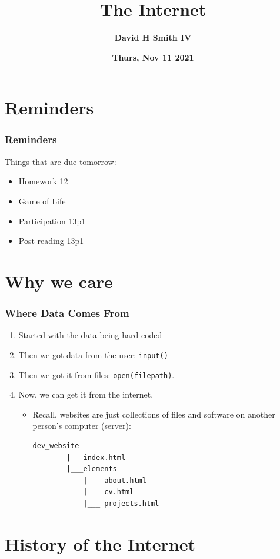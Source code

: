 \documentclass{beamer}
\title{\textbf{The Internet}}
\author{\textbf{David H Smith IV}}
\institute[\textbf{UIUC}]{\textbf{University of Illinois Urbana-Champaign}}
\date{\textbf{Thurs, Nov 11 2021}}
\begin{document}
\frame{\titlepage}

\section{Reminders}

%
%
\begin{frame}
    \frametitle{Reminders}
    Things that are due tomorrow:
    \begin{itemize}
        \item Homework 12 
        \item Game of Life 
        \item Participation 13p1
        \item Post-reading 13p1
    \end{itemize}
\end{frame}

\section{Why we care}
%
%
\begin{frame}[fragile]
    \frametitle{Where Data Comes From}
    \begin{enumerate}
        \item Started with the data being hard-coded
            \pause
        \item Then we got data from the user: \lstinline|input()|
            \pause
        \item Then we got it from files: \lstinline|open(filepath)|.
            \pause
        \item Now, we can get it from the internet. 
            \begin{itemize}
                \item Recall, websites are just collections of files and software on another person's computer (server):
                    \begin{lstlisting}[autogobble]
        dev_website
        |---index.html
        |___elements
            |--- about.html
            |--- cv.html
            |___ projects.html
                    \end{lstlisting} 
            \end{itemize}
    \end{enumerate}
\end{frame}

\section{History of the Internet}
\end{document}
